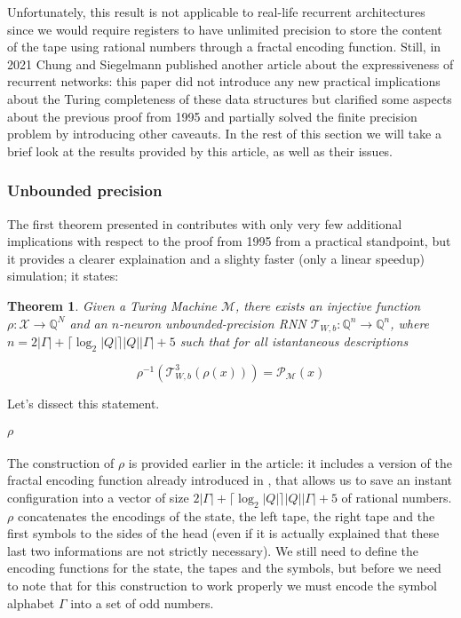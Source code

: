 \documentclass{article}
\newtheorem{theorem}{Theorem}
\begin{document}
Unfortunately, this result is not applicable to real-life recurrent architectures since we would require registers to have unlimited precision to store the content of the tape using rational numbers through a fractal encoding function.
Still, in 2021 Chung and Siegelmann published another article \cite{CHU21} about the expressiveness of recurrent networks: this paper did not introduce any new practical implications about the Turing completeness of these data structures but clarified some aspects about the previous proof from 1995 and partially solved the finite precision problem by introducing other caveauts. In the rest of this section we will take a brief look at the results provided by this article, as well as their issues.

\subsubsection{Unbounded precision}

The first theorem presented in \cite{CHU21} contributes with only very few additional implications with respect to the proof from 1995 from a practical standpoint, but it provides a clearer explaination and a slighty faster (only a linear speedup) simulation; it states:

\begin{theorem}\label{th:theorem1}
    Given a Turing Machine $\mathcal{M}$, there exists an injective function $\rho: \mathcal{X} \rightarrow \mathbb{Q}^N$ and an $n$-neuron unbounded-precision RNN $\mathcal{T}_{W,b}: \mathbb{Q}^n \rightarrow \mathbb{Q}^n$, where $n=2|\Gamma|+\lceil \log_2|Q|\rceil |Q||\Gamma| + 5$ such that for all istantaneous descriptions
    
    $$\rho^{-1}(\mathcal{T}^3_{W,b}(\rho(x))) = \mathcal{P}_{\mathcal{M}}(x)$$
\end{theorem}

Let's dissect this statement.

\paragraph{$\rho$}
The construction of $\rho$ is provided earlier in the article: it includes a version of the fractal encoding function already introduced in \cite{SIE95}, that allows us to save an instant configuration into a vector of size $2|\Gamma|+\lceil \log_2|Q|\rceil |Q||\Gamma| + 5$ of rational numbers. $\rho$ concatenates the encodings of the state, the left tape, the right tape and the first symbols to the sides of the head (even if it is actually explained that these last two informations are not strictly necessary). We still need to define the encoding functions for the state, the tapes and the symbols, but before we need to note that for this construction to work properly we must encode the symbol alphabet $\Gamma$ into a set of odd numbers.
\end{document}
